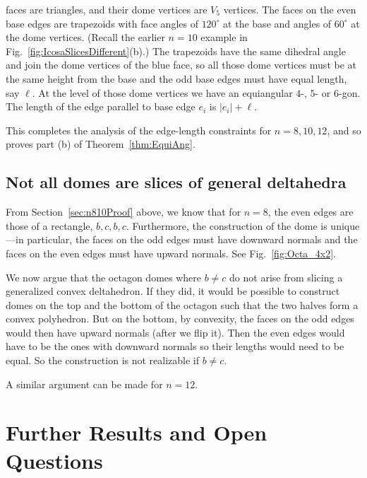 \documentclass[11pt]{article}
\newcommand{\seclab}[1]{\label{sec:#1}}
\newcommand{\thmref}[1]{\ref{thm:#1}}
\newcommand{\secref}[1]{\ref{sec:#1}}
\newcommand{\figref}[1]{\ref{fig:#1}}
\newcommand{\JOR}[1]{{\color{red} JOR: [#1]}}
\newcommand{\Anna}[1]{{\color{red} Anna: [#1]}}
\begin{document}
\begin{enumerate}[(1)]
faces are triangles, and
their dome vertices
are $V_5$ vertices.
The faces on the even %
base edges are 
trapezoids with face angles of $120^\circ$ at the base and angles of $60^\circ$ at the dome vertices. 
(Recall the earlier $n=10$ example in Fig.~\figref{IcosaSlicesDifferent}(b).)
The trapezoids have the same dihedral angle and join the 
dome vertices of the blue face, so
all 
those dome vertices
must be at the same height from the base 
and
the odd %
base edges must have equal length, say $\ell$.
At the level of 
those dome vertices
we have an equiangular $4$-, $5$- or $6$-gon. 
The length of the edge parallel to base edge $e_i$ is
$|e_i| + \ell$.
%
\end{enumerate}
This completes the analysis of the edge-length constraints for $n=8,10,12$,
and so proves part (b) of Theorem~\thmref{EquiAng}.

\subsection{Not all domes are slices of general deltahedra}
\seclab{NotSlice}
From Section~\secref{n810Proof} above, we know that for $n=8$,
the even edges are those of a rectangle, $b,c,b,c$.
Furthermore, the construction of the dome is unique---in particular,
the faces on the odd edges must have downward normals and the faces on the even edges must have upward normals.
See Fig.~\figref{Octa_4x2}.

We now argue that the octagon domes where $b \neq c$ do not arise from slicing a generalized convex deltahedron.
If they did, it would be possible to construct domes on the top and the bottom of the octagon such that the two halves form a convex polyhedron. But on the bottom, by convexity, the faces on the odd edges would then have upward normals (after we flip it). Then the even edges would have to be the ones with downward normals so their lengths would need to be equal.
So the construction is not realizable if $b \neq c$.

A similar argument can be made for $n=12$.


\section{Further Results and Open Questions}
\label{sec:further-results}
\end{document}
